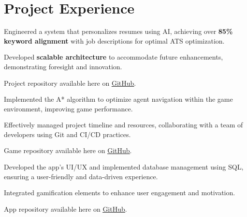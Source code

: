 \section{Project Experience}


    \begin{tightemize}
        \item Engineered a system that personalizes resumes using AI, achieving over \textbf{85\% keyword alignment} with job descriptions for optimal ATS optimization.
        \item Developed \textbf{scalable architecture} to accommodate future enhancements, demonstrating foresight and innovation.
        \item Project repository available here on \href{https://github.com/vmsaif/ats-pass-ai}{\ul{GitHub}}.
    \end{tightemize}


    \begin{tightemize}
        \item Implemented the A* algorithm to optimize agent navigation within the game environment, improving game performance.
        \item Effectively managed project timeline and resources, collaborating with a team of developers using Git and CI/CD practices.
        \item Game repository available here on \href{https://github.com/vmsaif/ant-path-finding-using-A-Star-algorithm}{\ul{GitHub}}.
    \end{tightemize}


    \begin{tightemize}
        \item Developed the app's UI/UX and implemented database management using SQL, ensuring a user-friendly and data-driven experience.
        \item Integrated gamification elements to enhance user engagement and motivation.
        \item App repository available here on \href{https://github.com/vmsaif/reversibleLearning}{\ul{GitHub}}.
    \end{tightemize}